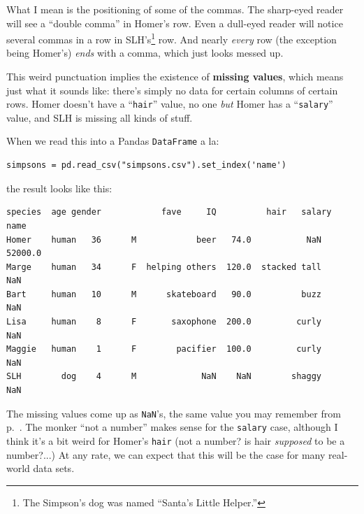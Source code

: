 
What I mean is the positioning of some of the commas. The sharp-eyed reader
will see a ``double comma'' in Homer's row. Even a dull-eyed reader will notice
several commas in a row in SLH's\footnote{The Simpson's dog was named ``Santa's
Little Helper.''} row. And nearly \textit{every} row (the exception being
Homer's) \textit{ends} with a comma, which just looks messed up.


This weird punctuation implies the existence of \textbf{missing values}, which
means just what it sounds like: there's simply no data for certain columns of 
certain rows. Homer doesn't have a ``\texttt{hair}'' value, no one \textit{but}
Homer has a ``\texttt{salary}'' value, and SLH is missing all kinds of stuff.

When we read this into a Pandas \texttt{DataFrame} a la:

\begin{Verbatim}[fontsize=\small,samepage=true,frame=single,framesep=3mm]
simpsons = pd.read_csv("simpsons.csv").set_index('name')
\end{Verbatim}

the result looks like this:

\begin{Verbatim}[fontsize=\CBCodeSmall,samepage=true,frame=leftline,framesep=5mm,framerule=1mm]
       species  age gender            fave     IQ          hair   salary
name                                                                    
Homer    human   36      M            beer   74.0           NaN  52000.0
Marge    human   34      F  helping others  120.0  stacked tall      NaN
Bart     human   10      M      skateboard   90.0          buzz      NaN
Lisa     human    8      F       saxophone  200.0         curly      NaN
Maggie   human    1      F        pacifier  100.0         curly      NaN
SLH        dog    4      M             NaN    NaN        shaggy      NaN
\end{Verbatim}


The missing values come up as \texttt{NaN}'s, the same value you may remember
from p.~\pageref{NaN}. The monker ``not a number'' makes sense for the
\texttt{salary} case, although I think it's a bit weird for Homer's
\texttt{hair} (not a number? is hair \textit{supposed} to be a number?...)
At any rate, we can expect that this will be the case for many real-world data
sets.

